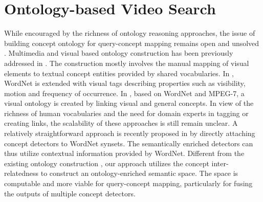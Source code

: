 \section{Ontology-based Video Search}
While encouraged by the richness of ontology reasoning approaches,
the issue of building concept ontology for query-concept mapping
remains open and unsolved
\cite{S.F.Chang:NISTTRECVID:2006,C.G.M.Snoek:NISTTRECVID:2006,W.H.Lin:ICME:2006}.
Multimedia and visual based ontology construction has been
previously addressed in
\cite{CeesG.M.Snoek:IEEETM:2006,Anthony.Hoogs:CVPR:2003,Hangzai.Luo:ACMMM:2006,L.Hollink:ACMMM:2005}.
The construction mostly involves the manual mapping of visual
elements to textual concept entities provided by shared
vocabularies. In \cite{Anthony.Hoogs:CVPR:2003}, WordNet is extended
with visual tags describing properties such as visibility, motion
and frequency of occurrence. In \cite{L.Hollink:ACMMM:2005}, based
on WordNet and MPEG-7, a visual ontology is created by linking
visual and general concepts. In view of the richness of human
vocabularies and the need for domain experts in tagging or creating
links, the scalability of these approaches is still remain unclear.
A relatively straightforward approach is recently proposed in
\cite{CeesG.M.Snoek:IEEETM:2006} by directly attaching concept
detectors to WordNet synsets. The semantically enriched detectors
can thus utilize contextual information provided by WordNet.
Different from the existing ontology construction
\cite{CeesG.M.Snoek:IEEETM:2006,Anthony.Hoogs:CVPR:2003,L.Hollink:ACMMM:2005},
our approach utilizes the concept inter-relatedness to construct an
ontology-enriched semantic space. The space is computable and more
viable for query-concept mapping, particularly for fusing the
outputs of multiple concept detectors.

